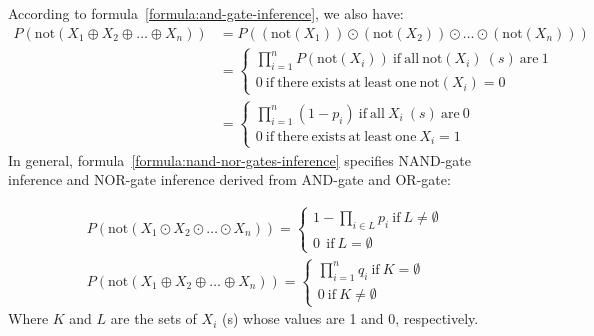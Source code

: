 \documentclass{article}
\numberwithin{equation}{section}
\numberwithin{figure}{section}
\numberwithin{table}{section}
\begin{document}
According to formula~\ref{formula:and-gate-inference}, we also have:
\begin{align*}
P\left(\mathrm{not}\left(X_1\oplus X_2\oplus \dots \oplus X_n\right)\right)&=P\left(\left(\mathrm{not}\left(X_1\right)\right)\odot \left(\mathrm{not}\left(X_2\right)\right)\odot \dots \odot \left(\mathrm{not}\left(X_n\right)\right)\right)\\
&=\left\{ \begin{array}{l}
\prod^n_{i=1}{P\left(\mathrm{not}\left(X_i\right)\right)}\ \mathrm{if\ all}\ \mathrm{not}\left(X_i\right)\ \left(s\right)\ \mathrm{are}\ 1 \\ 
0\ \mathrm{if\ there\ exists\ at\ least\ one\ not}\left(X_i\right)=0 \end{array}
\right.\\
&=\left\{ \begin{array}{l}
\prod^n_{i=1}{\left(1-p_i\right)}\ \mathrm{if\ all}\ X_i\ \left(s\right)\ \mathrm{are}\ 0 \\ 
0\ \mathrm{if\ there\ exists\ at\ least\ one\ }X_i=1 \end{array}
\right.
\end{align*}
In general, formula~\ref{formula:nand-nor-gates-inference} specifies NAND-gate inference and NOR-gate inference derived from AND-gate and OR-gate:

\begin{equation}
\begin{split}
&P\left(\mathrm{not}\left(X_1\odot X_2\odot \dots \odot X_n\right)\right)=\left\{ \begin{array}{r}
1-\prod_{i\in L}{p_i}\ \mathrm{if}\ L\neq \emptyset  \\ 
0\ \ \mathrm{if}\ L=\emptyset  \end{array}
\right.\\
&P\left(\mathrm{not}\left(X_1\oplus X_2\oplus \dots \oplus X_n\right)\right)=\left\{ \begin{array}{r}
\prod^n_{i=1}{q_i}\ \mathrm{if\ }K=\emptyset  \\ 
0\ \mathrm{if\ }K\neq \emptyset  \end{array}
\right.
\end{split}
\label{formula:nand-nor-gates-inference}
\end{equation}
Where $K$ and $L$ are the sets of $X_i$ (s) whose values are 1 and 0, respectively.
\end{document}
